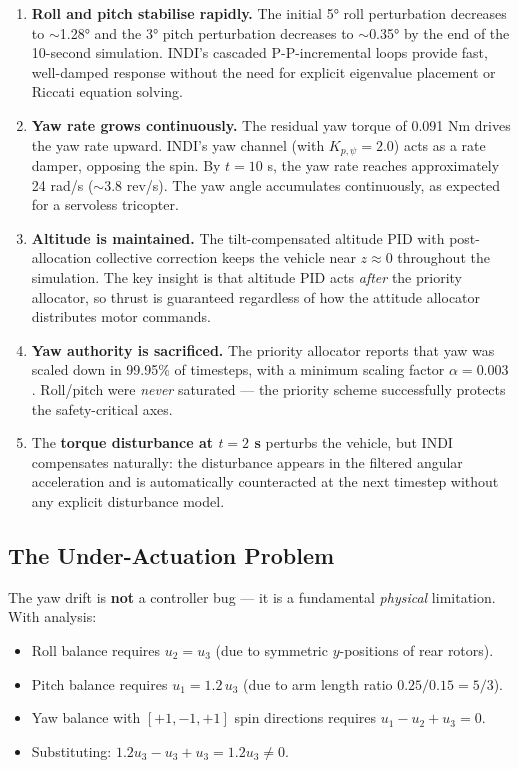 \documentclass[12pt, a4paper]{article}
\begin{document}
\begin{enumerate}
    \item \textbf{Roll and pitch stabilise rapidly.}  The initial 5° roll perturbation decreases to $\sim$1.28° and the 3° pitch perturbation decreases to $\sim$0.35° by the end of the 10-second simulation.  INDI's cascaded P-P-incremental loops provide fast, well-damped response without the need for explicit eigenvalue placement or Riccati equation solving.

    \item \textbf{Yaw rate grows continuously.}  The residual yaw torque of 0.091 Nm drives the yaw rate upward.  INDI's yaw channel (with $K_{p,\psi} = 2.0$) acts as a rate damper, opposing the spin.  By $t = 10$ s, the yaw rate reaches approximately 24 rad/s ($\sim$3.8 rev/s).  The yaw angle accumulates continuously, as expected for a servoless tricopter.

    \item \textbf{Altitude is maintained.}  The tilt-compensated altitude PID with post-allocation collective correction keeps the vehicle near $z \approx 0$ throughout the simulation.  The key insight is that altitude PID acts \emph{after} the priority allocator, so thrust is guaranteed regardless of how the attitude allocator distributes motor commands.

    \item \textbf{Yaw authority is sacrificed.}  The priority allocator reports that yaw was scaled down in 99.95\% of timesteps, with a minimum scaling factor $\alpha = 0.003$.  Roll/pitch were \emph{never} saturated --- the priority scheme successfully protects the safety-critical axes.

    \item The \textbf{torque disturbance at $t = 2$ s} perturbs the vehicle, but INDI compensates naturally: the disturbance appears in the filtered angular acceleration and is automatically counteracted at the next timestep without any explicit disturbance model.
\end{enumerate}

\subsection{The Under-Actuation Problem}

The yaw drift is \textbf{not} a controller bug --- it is a fundamental \emph{physical} limitation.  With analysis:
\begin{itemize}
    \item Roll balance requires $u_2 = u_3$ (due to symmetric $y$-positions of rear rotors).
    \item Pitch balance requires $u_1 = 1.2 \, u_3$ (due to arm length ratio $0.25/0.15 = 5/3$).
    \item Yaw balance with $[+1, -1, +1]$ spin directions requires $u_1 - u_2 + u_3 = 0$.
    \item Substituting: $1.2 u_3 - u_3 + u_3 = 1.2 u_3 \neq 0$.
\end{itemize}
\end{document}
